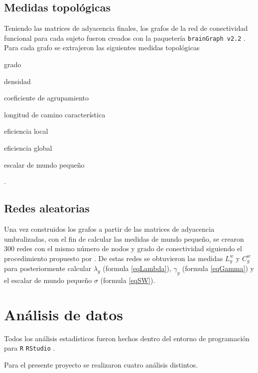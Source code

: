 \subsection{Medidas topológicas}
Teniendo las matrices de adyacencia finales, los grafos de la red de conectividad funcional para cada sujeto fueron creados con la paquetería \texttt{brainGraph v2.2} \parencite{Watson2018}. Para cada grafo se extrajeron las siguientes medidas topológicas
\begin{enumerate*}[label=\emph{\alph*}), before=\unskip{: }, itemjoin={{; }}, itemjoin*={{, y }}]
    \item grado
    \item densidad
    \item coeficiente de agrupamiento
    \item longitud de camino característica
    \item eficiencia local
    \item eficiencia global
    \item escalar de mundo pequeño
\end{enumerate*}.

\subsection{Redes aleatorias}
Una vez construidos los grafos a partir de las matrices de adyacencia umbralizadas, con el fin de calcular las medidas de mundo pequeño, se crearon 300 redes con el mismo número de nodos y grado de conectividad siguiendo el procedimiento propuesto por \textcite{Maslov2002}. De estas redes se obtuvieron las medidas $L^w_g$ y $C^w_g$ para posteriormente calcular $\lambda_g$ (formula \ref{eqLambda}), $\gamma_g$ (formula \ref{eqGamma}) y el escalar de mundo pequeño $\sigma$ (formula \ref{eqSW}).

\section{Análisis de datos}
Todos los análisis estadísticos fueron hechos dentro del entorno de programación para \texttt{R} \texttt{RStudio} \parencite{Rstudio2018}.

Para el presente proyecto se realizaron cuatro análisis distintos.

